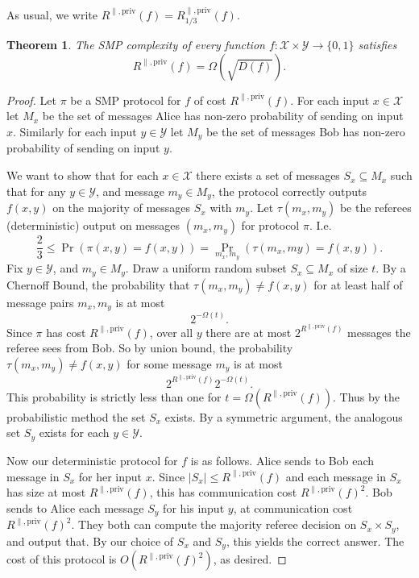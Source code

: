 \documentclass[11pt]{amsart}
\theoremstyle{plain}
\newtheorem{theorem}{Theorem}
\theoremstyle{definition}
\theoremstyle{plain}
\newcommand{\calX}{\mathcal{X}}
\newcommand{\calY}{\mathcal{Y}}
\begin{document}
As usual, we write $R^{\parallel,\mathrm{priv}}(f) = R^{\parallel,\mathrm{priv}}_{1/3}(f)$.

\begin{theorem}
The SMP complexity of every function $f : \calX \times \calY \to \{0,1\}$ satisfies
\[
R^{\parallel,\mathrm{priv}}(f) = \Omega(\sqrt{D(f)}).
\]
\end{theorem}

\begin{proof}
	Let $\pi$ be a SMP protocol for $f$ of cost $R^{\parallel,\mathrm{priv}}(f)$. For each input $x\in\calX$ let $M_x$ be the set of messages Alice has non-zero probability of sending on input $x$. Similarly for each input $y\in\calY$ let $M_y$ be the set of messages Bob has non-zero probability of sending on input $y$.
	
	We want to show that for each $x \in \calX$ there exists a set of messages $S_x \subseteq M_x$ such that for any $y \in \calY$, and message $m_y \in M_y$, the protocol correctly outputs $f(x,y)$ on the majority of messages $S_x$ with $m_y$. Let $\tau(m_x,m_y)$ be the referees (deterministic) output on messages $(m_x,m_y)$ for protocol $\pi$. I.e.
	$$\frac{2}{3} \leq \Pr(\pi(x,y) = f(x,y)) = \Pr_{m_x,m_y}(\tau(m_x,my) = f(x,y)).$$
	Fix $y\in \calY$, and $m_y \in M_y$. Draw a uniform random subset $S_x \subseteq M_x$  of size $t$. By a Chernoff Bound, the probability that $\tau(m_x,m_y) \neq f(x,y)$ for at least half of message pairs $m_x, m_y$ is at most
	$$2^{-\Omega(t)}.$$
	Since $\pi$ has cost $R^{\parallel,\mathrm{priv}}(f)$, over all $y$ there are at most $2^{R^{\parallel,\mathrm{priv}}(f)}$ messages the referee sees from Bob. So by union bound, the probability $\tau(m_x,m_y) \neq f(x,y)$ for some message $m_y$ is at most
	$$2^{R^{\parallel,\mathrm{priv}}(f)}2^{-\Omega(t)}.$$
	This probability is strictly less than one for $t = \Omega(R^{\parallel,\mathrm{priv}}(f))$. Thus by the probabilistic method the set $S_x$ exists. By a symmetric argument, the analogous set $S_y$ exists for each $y \in \calY$.
	
	Now our deterministic protocol for $f$ is as follows. Alice sends to Bob each message in $S_x$ for her input $x$. Since $|S_x| \leq R^{\parallel,\mathrm{priv}}(f)$ and each message in $S_x$ has size at most $R^{\parallel,\mathrm{priv}}(f)$, this has communication cost $R^{\parallel,\mathrm{priv}}(f)^2$. Bob sends to Alice each message $S_y$ for his input $y$, at communication cost $R^{\parallel,\mathrm{priv}}(f)^2$. They both can compute the majority referee decision on $S_x\times S_y$, and output that. By our choice of $S_x$ and $S_y$, this yields the correct answer. The cost of this protocol is $O(R^{\parallel,\mathrm{priv}}(f)^2)$, as desired.
\end{proof}
\end{document}
